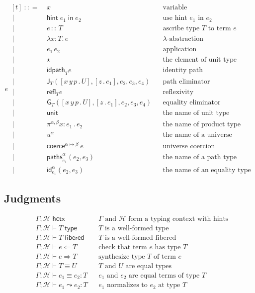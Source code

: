 \documentclass{article}
\newcommand{\G}{\Gamma} %
\newcommand{\T}{T} %
\newcommand{\U}{U} %
\newcommand{\x}{x} %
\newcommand{\e}{e} %
\newcommand{\bnf}{\ \mathrel{{:}{:}{=}}\ }
\newcommand{\bnfor}{\ \mid\ \ }
\newcommand{\lam}[2]{\lambda #1 {:} #2 .\,} %
\newcommand{\app}[2]{#1\,#2} %
\newcommand{\abst}[2]{[#1 \,.\, #2]} %
\newcommand{\ascribe}[2]{#1 \,{:}{:}\, #2} %
\newcommand{\unitTerm}{\star} %
\newcommand{\coerce}[3]{\mathsf{coerce}^{#2{\mapsto}#3}\ #1}
\newcommand{\PrElim}[6]{\mathsf{J}_{#1}(#2, #3, #4, #5, #6)} %
\newcommand{\JuElim}[6]{\mathsf{G}_{#1}(#2, #3, #4, #5, #6)} %
\newcommand{\prRefl}[1]{\mathsf{idpath}_{#1}}  %
\newcommand{\juRefl}[1]{\mathsf{refl}_{#1}}    %
\newcommand{\nUnit}{\mathsf{unit}} %
\newcommand{\nProd}[3]{\pi^{#1} #2 {:} #3 \,.\,} %
\newcommand{\nUniverse}[1]{u^{#1}}  %
\newcommand{\nPrEqual}[4]{\mathsf{paths}^{#1}_{#2}(#3,#4)} %
\newcommand{\nJuEqual}[4]{\mathsf{id}^{#1}_{#2}(#3,#4)} %
\newcommand{\istype}[2]{#1 \vdash #2\;\mathsf{type}} %
\newcommand{\isfib}[2]{#1 \vdash #2\;\mathsf{fibered}} %
\newcommand{\eqtype}[3]{#1 \vdash #2 \equiv #3} %
\newcommand{\eqterm}[4]{#1 \vdash #2 \equiv #3 : #4} %
\newcommand{\chkterm}[3]{#1 \vdash #2 \Leftarrow #3} %
\newcommand{\synterm}[3]{#1 \vdash #2 \Rightarrow #3} %
\newcommand{\hintin}[1]{\mathsf{hint}\;#1\;\mathsf{in}\;} %
\newcommand{\ishint}[2]{#1 ; #2 \; \mathsf{hctx}}
\renewcommand{\H}{\mathcal{H}}      %
\newcommand{\GH}{\G ; \H}           %
\newcommand{\whnf}[4]{#1 \vdash #2 \leadsto #3 : #4} %
\begin{document}
\begin{equation*}
  \e
  \begin{aligned}[t]
    \bnf   {}&  \x   &&\text{variable} \\
    \bnfor {}&  \hintin{\e_1} e_2 &&\text{use hint $\e_1$ in $\e_2$} \\
    \bnfor {}&  \ascribe{\e}{\T}  &&\text{ascribe type $\T$ to term $\e$} \\
    \bnfor {}&  \lam{\x}{\T} \e  &&\text{$\lambda$-abstraction} \\
    \bnfor {}&   \app{\e_1}{\e_2}  &&\text{application} \\
    \bnfor {}&  \unitTerm  &&\text{the element of unit type} \\
    \bnfor {}&  \prRefl{\T}{\e}  &&\text{identity path} \\
    \bnfor {}&  \PrElim{\T}{\abst{x\,y\,p}{\U}}{\abst{z}{\e_1}}{\e_2}{\e_3}{\e_4}  &&\text{path eliminator} \\
    \bnfor {}&  \juRefl{\T}{\e}  &&\text{reflexivity} \\
    \bnfor {}&  \JuElim{\T}{\abst{x\,y\,p}{\U}}{\abst{z}{\e_1}}{\e_2}{\e_3}{\e_4}  &&\text{equality eliminator} \\
    \bnfor {}&  \nUnit  &&\text{the name of unit type} \\
    \bnfor {}&  \nProd{\alpha,\beta}{\x}{\e_1} \e_2  &&\text{the name of product type} \\
    \bnfor {}&  \nUniverse{\alpha} &&\text{the name of a universe} \\
    \bnfor {}&  \coerce{\e}{\alpha}{\beta}  &&\text{universe coercion} \\
    \bnfor {}&  \nPrEqual{\alpha}{\e_1}{\e_2}{\e_3}  &&\text{the name of a path type} \\
    \bnfor {}&  \nJuEqual{\alpha}{\e_1}{\e_2}{\e_3}  &&\text{the name of an equality type}
  \end{aligned}
\end{equation*}

\subsection{Judgments}
\label{sec:bidirectional-judgments}

\begin{align*}
& \ishint{\G}{\H} & & \text{$\G$ and $\H$ form a typing context with hints} \\
& \istype{\GH}{\T} & & \text{$\T$ is a well-formed type} \\
& \isfib{\GH}{\T} & & \text{$\T$ is a well-formed fibered} \\
& \chkterm{\GH}{\e}{\T} & & \text{check that term $\e$ has type $T$} \\
& \synterm{\GH}{\e}{\T} & & \text{synthesize type $\T$ of term $e$} \\
& \eqtype{\GH}{\T}{\U} & & \text{$\T$ and $\U$ are equal types} \\
& \eqterm{\GH}{\e_1}{\e_2}{\T} & & \text{$\e_1$ and $\e_2$ are equal terms of type $\T$} \\
& \whnf{\GH}{\e_1}{\e_2}{\T} & & \text{$\e_1$ normalizes to $\e_2$ at type $\T$}
\end{align*}
\end{document}
